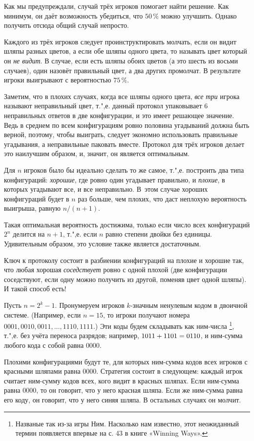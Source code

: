 \documentclass[twoside]{book}
\begin{document}
Как мы предупреждали, случай трёх игроков помогает найти решение.
Как минимум, он даёт возможность убедиться, что $50\,\%$ можно улучшить.
Однако получить отсюда общий случай непросто.

Каждого из трёх игроков следует проинструктировать молчать, если он видит шляпы разных цветов,
а если обе шляпы одного цвета, то называть цвет который он \emph{не видит}.
В случае, если есть шляпы обоих цветов (а это шесть из восьми случаев), один назовёт правильный цвет, а два других промолчат.
В результате игроки выигрывают с вероятностью $75\,\%$.

Заметим, что в плохих случаях, когда все шляпы одного цвета, \emph{все три} игрока называют неправильный цвет, т.",е. данный протокол упаковывает 6 неправильных ответов в две конфигурации, и это имеет решающее значение.
Ведь в среднем по всем конфигурациям ровно половина угадываний должна быть верной, поэтому, чтобы выиграть, следует экономно использовать правильные угадывания, а неправильные паковать вместе.
Протокол для трёх игроков делает это наилучшим образом, и, значит, он является оптимальным.

Для $n$ игроков было бы идеально сделать то же самое,
т.",е. построить два типа конфигураций: \emph{хорошие}, где ровно один угадывает правильно, и \emph{плохие}, в которых угадывают все, и все неправильно.
В~этом случае хороших конфигураций будет в $n$ раз больше, чем плохих,
что даст неплохую вероятность выигрыша, равную $n/(n+1)$.

Такая оптимальная вероятность достижима, только если число всех конфигураций $2^n$ делится на $n+1$,
т.",е. если $n$ равно степени двойки без единицы.
Удивительным образом, это условие также является достаточным.

Ключ к протоколу состоит в разбиении конфигураций на плохие и хорошие так, что любая хорошая \emph{соседствует} ровно с одной плохой (две конфигурации соседствуют, если одну можно получить из другой, поменяв цвет одной шляпы).
И такой способ есть!

Пусть $n=2^k-1$.
Пронумеруем игроков $k$-значным ненулевым кодом в двоичной системе.
(Например, если $n=15$, то игроки получают номера $0001,0010,0011,\dots,1110,1111$.)
Эти коды будем складывать как ним-числа%
\footnote{Названые так из-за игры Ним.
Насколько нам известно, этот неожиданный термин появляется впервые на с. 43 в книге «Winning Ways».}, т.",е. без учёта переноса разрядов;
например, $1011 \z+ 1101 =0110$, и ним-сумма любого кода с собой равна $0000$.

Плохими конфигурациями будут те, для которых ним-сумма кодов всех игроков с красными шляпами равна $0000$.
Стратегия состоит в следующем:
каждый игрок считает ним-сумму кодов всех, кого видит в красных шляпах.
Если ним-сумма равна $0000$, то он говорит, что у него красная шляпа.
Если же ним-сумма равна его коду, он говорит, что у него синяя шляпа.
В остальных случаях он молчит.
\end{document}
